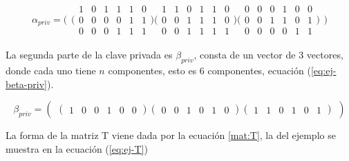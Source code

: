 \begin{equation}\label{eq:ej-alpha-priv}
{\alpha_{priv}} = 
	\Bigg(\begin{matrix}
	\Big(\begin{smallmatrix}
		1 & 0 & 1 & 1 & 1 & 0\\
		0 & 0 & 0 & 0 & 1 & 1\\
		0 & 0 & 0 & 1 & 1 & 1
	\end{smallmatrix}\Big)
		
	\Big(\begin{smallmatrix}
		1 & 1 & 0 & 1 & 1 & 0\\
		0 & 0 & 1 & 1 & 1 & 0\\
		0 & 0 & 1 & 1 & 1 & 1
	\end{smallmatrix}\Big)
	
	\Big(\begin{smallmatrix}
		0 & 0 & 0 & 1 & 0 & 0\\
		0 & 0 & 1 & 1 & 0 & 1\\
		0 & 0 & 0 & 0 & 1 & 1
	\end{smallmatrix}\Big)
	\end{matrix}\Bigg)
\end{equation}

La segunda parte de la clave privada es $\beta_{priv}$, consta de un vector de $3$ vectores, donde cada uno tiene $n$ componentes, esto es $6$ componentes, ecuación (\ref{eq:ej-beta-priv}).

\begin{equation}\label{eq:ej-beta-priv}
{\beta_{priv}} = 
	\left(\begin{matrix}
		\left(\begin{smallmatrix}
			1 & 0 & 0 & 1 & 0 & 0
		\end{smallmatrix}\right)
	
		\left(\begin{smallmatrix}
			0 & 0 & 1 & 0 & 1 & 0
		\end{smallmatrix}\right)
	
		\left(\begin{smallmatrix}
			1 & 1 & 0 & 1 & 0 & 1
		\end{smallmatrix}\right)
	\end{matrix}\right)
\end{equation}


La forma de la matriz T viene dada por la ecuación \ref{mat:T}, la del ejemplo se muestra en la ecuación (\ref{eq:ej-T})

